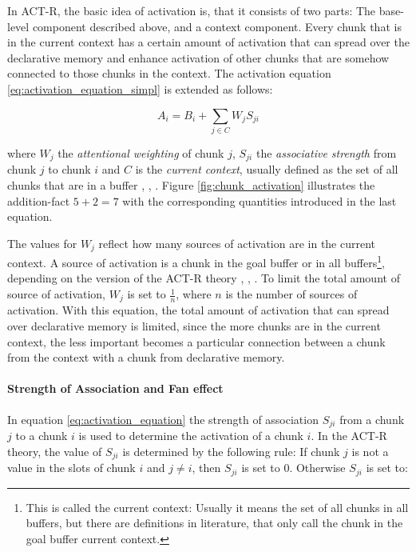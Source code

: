 In ACT-R, the basic idea of activation is, that it consists of two parts: The base-level component described above, and a context component. Every chunk that is in the current context has a certain amount of activation that can spread over the declarative memory and enhance activation of other chunks that are somehow connected to those chunks in the context. The activation equation \eqref{eq:activation_equation_simpl} is extended as follows:

\begin{equation}
\label{eq:activation_equation}
 A_i = B_i + \sum_{j \in C}{W_j S_{ji}}
\end{equation}

where $W_j$ the \emph{attentional weighting} of chunk $j$, $S_{ji}$ the \emph{associative strength} from chunk $j$ to chunk $i$ and $C$ is the \emph{current context}, usually defined as the set of all chunks that are in a buffer \cite[1042]{anderson_integrated_2004}, \cite[p. 33]{taatgen_modeling_2006}, \cite[unit 5]{actr_tutorial}. Figure \ref{fig:chunk_activation} illustrates the addition-fact $5 + 2 = 7$ with the corresponding quantities introduced in the last equation. 

The values for $W_j$ reflect how many sources of activation are in the current context. A source of activation is a chunk in the goal buffer or in all buffers\footnote{This is called the current context: Usually it means the set of all chunks in all buffers, but there are definitions in literature, that only call the chunk in the goal buffer current context.}, depending on the version of the ACT-R theory \cite[p. 1042]{anderson_integrated_2004}, \cite[33]{taatgen_modeling_2006}, \cite[unit 5, p. 1]{actr_tutorial}. To limit the total amount of source of activation, $W_j$ is set to $\frac{1}{n}$, where $n$ is the number of sources of activation. With this equation, the total amount of activation that can spread over declarative memory is limited, since the more chunks are in the current context, the less important becomes a particular connection between a chunk from the context with a chunk from declarative memory.

\paragraph{Strength of Association and Fan effect}

In equation \eqref{eq:activation_equation} the strength of association $S_{ji}$ from a chunk $j$ to a chunk $i$ is used to determine the activation of a chunk $i$.  In the ACT-R theory, the value of $S_{ji}$ is determined by the following rule: If chunk $j$ is not a value in the slots of chunk $i$ and $j \neq i$, then $S_{ji}$ is set to 0. Otherwise $S_{ji}$ is set to: 

